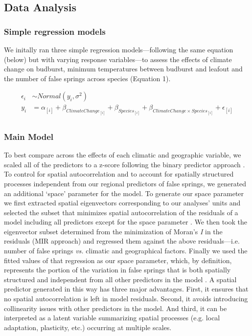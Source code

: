 \documentclass{article}\usepackage[]{graphicx}\usepackage[]{color}
\begin{document}
\subsection*{Data Analysis} 
\subsubsection*{Simple regression models}
We initally ran three simple regression models---following the same equation (below) but with varying response variables---to assess the effects of climate change on budburst, minimum temperatures between budburst and leafout and the number of false springs across species (Equation 1).

\begin{align*}
\epsilon_i & \sim Normal(y_i ,  \sigma^{2}) \tag{1}\\
y_i &= \alpha_{[i]} + \beta_{ClimateChange_{[i]}} + \beta_{Species_{[i]}} + \beta_{ClimateChange \times Species_{[i]}} + \epsilon_{[i]} \nonumber\\
\end{align*}

\subsubsection*{Main Model}
To best compare across the effects of each climatic and geographic variable, we scaled all of the predictors to a z-score following the binary predictor approach \citep{Gelman2006}. To control for spatial autocorrelation and to account for spatially structured processes independent from our regional predictors of false springs, we generated an additional `space' parameter for the model. To generate our space parameter we first extracted spatial eigenvectors corresponding to our analyses' units and selected the subset that minimizes spatial autocorrelation of the residuals of a model including all predictors except for the space parameter \citep[][ see supplemental materials `Methods: Spatial parameter' for more details]{diniz2012selection,Baumen2017}. We then took the eigenvector subset determined from the minimization of Moran's \textit{I} in the residuals (MIR approach) and regressed them against the above residuals---i.e. number of false springs \emph{vs.} climatic and geographical factors. Finally we used the fitted values of that regression as our space parameter, which, by definition, represents the portion of the variation in false springs that is both spatially structured and independent from all other predictors in the model \citep[e.g. average spring temperature, elevation, etc.][]{griffith2006spatial,morales2012imprint}. A spatial predictor generated in this way has three major advantages. First, it ensures that no spatial autocorrelation is left in model residuals. Second, it avoids introducing collinearity issues with other predictors in the model. And third, it can be interpreted as a latent variable summarizing spatial processes (e.g. local adaptation, plasticity, etc.) occurring at multiple scales.
\end{document}
